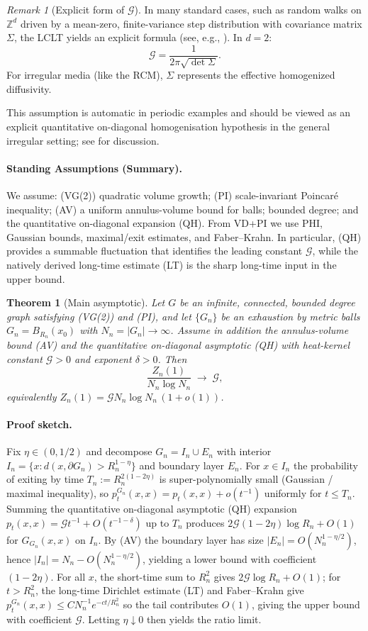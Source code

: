 \documentclass[reqno]{amsart}
\numberwithin{equation}{section}
\newtheorem{theorem}{Theorem}[section]
\theoremstyle{definition}
\theoremstyle{remark}
\newtheorem{remark}[remark]{Remark}
\newcommand{\cG}{\mathcal{G}}
\begin{document}
\begin{remark}[Explicit form of $\cG$]\label{rem:G_formula}
In many standard cases, such as random walks on $\mathbb{Z}^d$ driven by a mean-zero, finite-variance step distribution with covariance matrix $\Sigma$, the LCLT yields an explicit formula (see, e.g., \cite[Ch. 2]{LawlerLimic10}). In $d=2$:
\[
\cG = \frac{1}{2\pi\sqrt{\det\Sigma}}.
\]
For irregular media (like the RCM), $\Sigma$ represents the effective homogenized diffusivity.
\end{remark}

This assumption is automatic in periodic examples and should be viewed as an explicit quantitative on-diagonal homogenisation hypothesis in the general irregular setting; see  for discussion.
\paragraph{Standing Assumptions (Summary).} We assume: (VG(2)) quadratic volume growth; (PI) scale-invariant Poincaré inequality; (AV) a uniform annulus-volume bound for balls; bounded degree; and the quantitative on-diagonal expansion (QH). From VD+PI we use PHI, Gaussian bounds, maximal/exit estimates, and Faber--Krahn. In particular, (QH) provides a summable fluctuation that identifies the leading constant $\cG$, while the natively derived long-time estimate (LT) is the sharp long-time input in the upper bound.

\begin{theorem}[Main asymptotic]\label{thm:main}
Let $G$ be an infinite, connected, bounded degree graph satisfying (VG(2)) and (PI), and let $\{G_n\}$ be an exhaustion by metric balls $G_n=B_{R_n}(x_0)$ with $N_n=|G_n|\to\infty$. Assume in addition the annulus-volume bound (AV) and the quantitative on-diagonal asymptotic (QH) with heat-kernel constant $\cG>0$ and exponent $\delta>0$. Then
\[
  \frac{Z_n(1)}{N_n\log N_n}\;\longrightarrow\;\cG,
\]
equivalently $Z_n(1)=\cG N_n\log N_n\,(1+o(1))$.
\end{theorem}

\paragraph{Proof sketch.} Fix $\eta\in(0,1/2)$ and decompose $G_n=I_n\cup E_n$ with interior $I_n=\{x: d(x,\partial G_n)>R_n^{1-\eta}\}$ and boundary layer $E_n$. For $x\in I_n$ the probability of exiting by time $T_n:=R_n^{2(1-2\eta)}$ is super-polynomially small (Gaussian / maximal inequality), so $p_t^{G_n}(x,x)=p_t(x,x)+o(t^{-1})$ uniformly for $t\le T_n$. Summing the quantitative on-diagonal asymptotic (QH) expansion $p_t(x,x)=\cG t^{-1}+O(t^{-1-\delta})$ up to $T_n$ produces $2\cG(1-2\eta)\log R_n+O(1)$ for $G_{G_n}(x,x)$ on $I_n$. By (AV) the boundary layer has size $|E_n|=O(N_n^{1-\eta/2})$, hence $|I_n|=N_n-O(N_n^{1-\eta/2})$, yielding a lower bound with coefficient $(1-2\eta)$. For all $x$, the short-time sum to $R_n^2$ gives $2\cG\log R_n+O(1)$; for $t>R_n^2$, the long-time Dirichlet estimate (LT) and Faber--Krahn give $p_t^{G_n}(x,x)\le C N_n^{-1} e^{-c t/R_n^2}$ so the tail contributes $O(1)$, giving the upper bound with coefficient $\cG$. Letting $\eta\downarrow0$ then yields the ratio limit.
\end{document}
